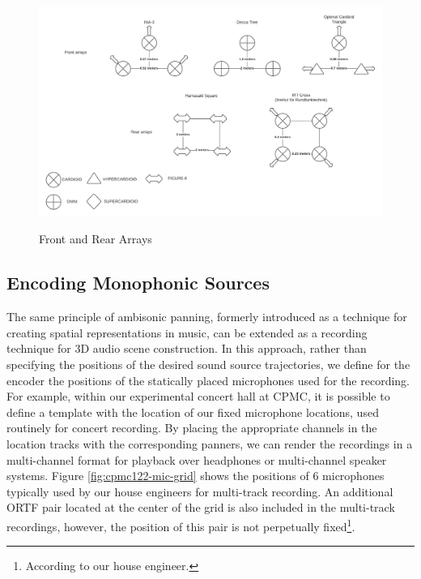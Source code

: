\begin{figure}[ht!]%
\centering
\includegraphics[width=1.0\textwidth]{img/front-n-rear-arrays.pdf} 
\label{fig:fnr-arrays}
\caption{Front and Rear Arrays}
\end{figure}

\subsection{Encoding Monophonic Sources}


The same principle of ambisonic panning, formerly introduced as a technique for creating spatial representations in music, can be extended as a recording technique for 3D audio scene construction. In this approach, rather than specifying the positions of the desired sound source trajectories, we define for the encoder the positions of the statically placed microphones used for the recording. For example, within our experimental concert hall at CPMC, it is possible to define a template with the location of our fixed microphone locations, used routinely for concert recording. By placing the appropriate channels in the location tracks with the corresponding panners, we can render the recordings in a multi-channel format for playback over headphones or multi-channel speaker systems. Figure \ref{fig:cpmc122-mic-grid} shows the positions of 6 microphones typically used by our house engineers for multi-track recording. An additional ORTF pair located at the center of the grid is also included in the multi-track recordings, however, the position of this pair is not perpetually fixed\footnote{According to our house engineer.}. 

